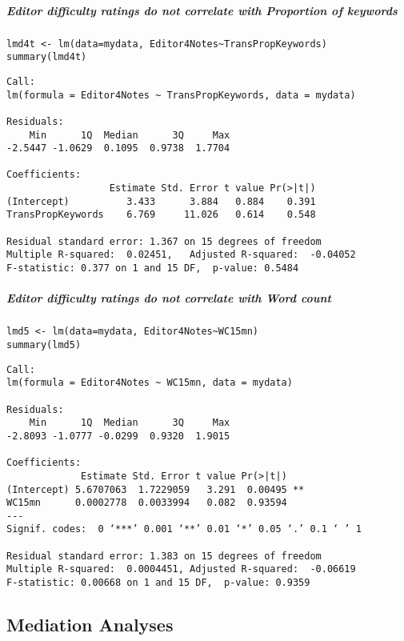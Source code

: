\documentclass[10pt]{article}
\begin{document}
\subparagraph*{Editor difficulty ratings do not correlate with Proportion of keywords}
\label{sec-2-2-3-2-3}

\begin{verbatim}
lmd4t <- lm(data=mydata, Editor4Notes~TransPropKeywords)
summary(lmd4t)
\end{verbatim}

\begin{verbatim}
Call:
lm(formula = Editor4Notes ~ TransPropKeywords, data = mydata)

Residuals:
    Min      1Q  Median      3Q     Max 
-2.5447 -1.0629  0.1095  0.9738  1.7704 

Coefficients:
                  Estimate Std. Error t value Pr(>|t|)
(Intercept)          3.433      3.884   0.884    0.391
TransPropKeywords    6.769     11.026   0.614    0.548

Residual standard error: 1.367 on 15 degrees of freedom
Multiple R-squared:  0.02451,	Adjusted R-squared:  -0.04052 
F-statistic: 0.377 on 1 and 15 DF,  p-value: 0.5484
\end{verbatim}



\subparagraph*{Editor difficulty ratings do not correlate with Word count}
\label{sec-2-2-3-2-4}

\begin{verbatim}
lmd5 <- lm(data=mydata, Editor4Notes~WC15mn)
summary(lmd5)
\end{verbatim}

\begin{verbatim}
Call:
lm(formula = Editor4Notes ~ WC15mn, data = mydata)

Residuals:
    Min      1Q  Median      3Q     Max 
-2.8093 -1.0777 -0.0299  0.9320  1.9015 

Coefficients:
             Estimate Std. Error t value Pr(>|t|)   
(Intercept) 5.6707063  1.7229059   3.291  0.00495 **
WC15mn      0.0002778  0.0033994   0.082  0.93594   
---
Signif. codes:  0 ‘***’ 0.001 ‘**’ 0.01 ‘*’ 0.05 ‘.’ 0.1 ‘ ’ 1

Residual standard error: 1.383 on 15 degrees of freedom
Multiple R-squared:  0.0004451,	Adjusted R-squared:  -0.06619 
F-statistic: 0.00668 on 1 and 15 DF,  p-value: 0.9359
\end{verbatim}


\subsection{Mediation Analyses}
\label{sec-2-3}
\end{document}
